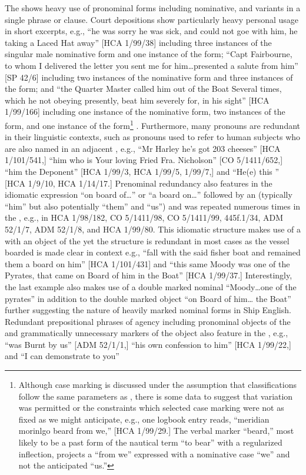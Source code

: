 The  shows heavy use of pronominal forms including nominative,  and  variants in a single phrase or clause. Court depositions show particularly heavy personal  usage in short excerpts, e.g., “he was sorry he was sick, and could not goe with him, he taking a Laced Hat away” [HCA 1/99/38] including three instances of the singular male  nominative form and one instance of the  form; “Capt Fairbourne, to whom I delivered the letter you sent me for him…presented a salute from him” [SP 42/6] including two instances of the nominative form and three instances of the  form; and “the Quarter Master called him out of the Boat Several times, which he not obeying presently, beat him severely for, in his sight” [HCA 1/99/166] including one instance of the nominative form, two instances of the  form, and one instance of the  form\footnote{Although case marking is discussed under the assumption that classifications follow the same parameters as , there is some data to suggest that variation was permitted or the constraints which selected case marking were not as fixed as we might anticipate, e.g., one logbook entry reads, “meridian morinlgo beard from we,” [HCA 1/99/29.] The verbal marker “beard,” most likely to be a past form of the nautical term “to bear” with a regularized inflection, projects a  “from we” expressed with a nominative case  “we” and not the anticipated  “us.”} . Furthermore, many pronouns are redundant in their linguistic contexts, such as pronouns used to refer to human subjects who are also named in an adjacent , e.g., “Mr Harley he’s got 203 cheeses” [HCA 1/101/541,] “him who is Your loving Fried Fra. Nicholson” [CO 5/1411/652,] “him the Deponent” [HCA 1/99/3, HCA 1/99/5, 1/99/7,] and “He(e) this ” [HCA 1/9/10, HCA 1/14/17.] Prenominal redundancy also features in the idiomatic expression “on board of…” or “a board on…” followed by an   (typically “him” but also potentially “them” and “us”) and was repeated numerous times in the , e.g., in HCA 1/98/182, CO 5/1411/98, CO 5/1411/99, 445f.1/34, ADM 52/1/7, ADM 52/1/8, and HCA 1/99/80. This idiomatic structure makes use of a  with an  object of the  yet the structure is redundant in most cases as the vessel boarded is made clear in context e.g., “fall with the said fisher boat and remained them a board on him” [HCA 1/101/431] and “this same Moody was one of the Pyrates, that came on Board of him in the Boat” [HCA 1/99/37.] Interestingly, the last example also makes use of a double marked nominal “Moody…one of the pyrates” in addition to the double marked object “on Board of him… the Boat” further suggesting the nature of heavily marked nominal forms in Ship English. Redundant prepositional phrases of agency including pronominal objects of the  and grammatically unnecessary markers of the  object also feature in the , e.g., “was Burnt by us” [ADM 52/1/1,] “his own confession to him” [HCA 1/99/22,] and “I can demonstrate to you” 